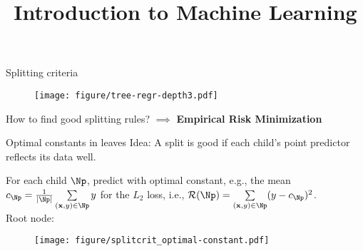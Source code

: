 \documentclass[11pt,compress,t,notes=noshow, xcolor=table]{beamer}
\title{Introduction to Machine Learning}
\begin{document}
    


\begin{frame}{Splitting criteria}

 \begin{figure}
    \centering
      \texttt{[image: figure/tree-regr-depth3.pdf]} %
    \end{figure}

How to find good splitting rules? $\implies$ \textbf{Empirical Risk Minimization}

\end{frame}

\begin{vbframe}{Optimal constants in leaves}
Idea: A split is good if each child's point predictor reflects its data well. %
\vspace{0.2cm}

For each child $\Np$, predict with optimal constant, e.g., the mean $c_{\Np} = \frac{1}{|\Np|}\sum\limits_{(\xv, y) \in \Np} y$ for the $L_2$ loss, i.e., $\risk(\Np) = \sum\limits_{(\xv, y) \in \Np} (y - c_{\Np})^2$.\\

Root node:

\begin{figure}
\texttt{[image: figure/splitcrit\_optimal-constant.pdf]} 
\end{figure}



\end{vbframe}
\end{document}
